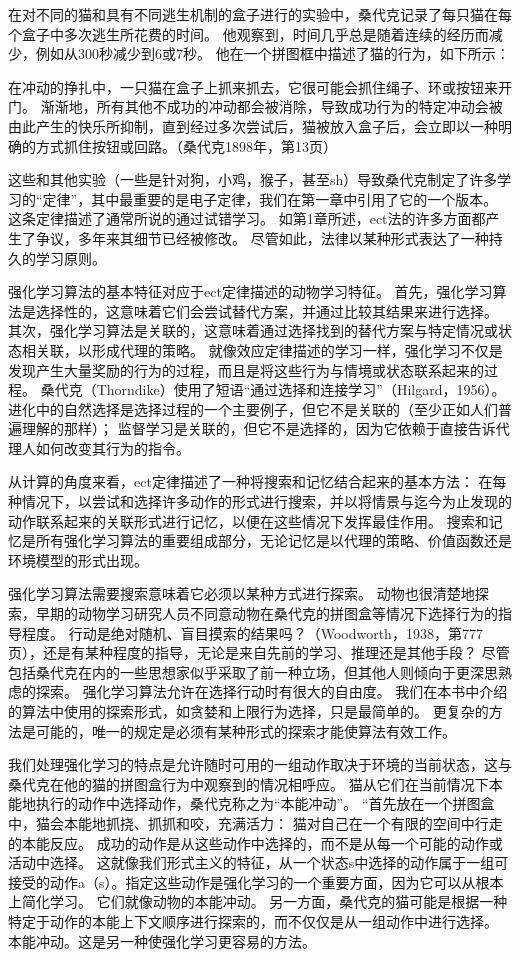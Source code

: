 {在对不同的猫和具有不同逃生机制的盒子进行的实验中，桑代克记录了每只猫在每个盒子中多次逃生所花费的时间。
他观察到，时间几乎总是随着连续的经历而减少，例如从300秒减少到6或7秒。
他在一个拼图框中描述了猫的行为，如下所示：


在冲动的挣扎中，一只猫在盒子上抓来抓去，它很可能会抓住绳子、环或按钮来开门。
渐渐地，所有其他不成功的冲动都会被消除，导致成功行为的特定冲动会被由此产生的快乐所抑制，直到经过多次尝试后，猫被放入盒子后，会立即以一种明确的方式抓住按钮或回路。（桑代克1898年，第13页）


这些和其他实验（一些是针对狗，小鸡，猴子，甚至sh）导致桑代克制定了许多学习的“定律”，其中最重要的是电子定律，我们在第一章中引用了它的一个版本。
这条定律描述了通常所说的通过试错学习。
如第1章所述，ect法的许多方面都产生了争议，多年来其细节已经被修改。
尽管如此，法律以某种形式表达了一种持久的学习原则。


强化学习算法的基本特征对应于ect定律描述的动物学习特征。
首先，强化学习算法是选择性的，这意味着它们会尝试替代方案，并通过比较其结果来进行选择。
其次，强化学习算法是关联的，这意味着通过选择找到的替代方案与特定情况或状态相关联，以形成代理的策略。
就像效应定律描述的学习一样，强化学习不仅是发现产生大量奖励的行为的过程，而且是将这些行为与情境或状态联系起来的过程。
桑代克（Thorndike）使用了短语“通过选择和连接学习”（Hilgard，1956）。
进化中的自然选择是选择过程的一个主要例子，但它不是关联的（至少正如人们普遍理解的那样）；
监督学习是关联的，但它不是选择的，因为它依赖于直接告诉代理人如何改变其行为的指令。


从计算的角度来看，ect定律描述了一种将搜索和记忆结合起来的基本方法：
在每种情况下，以尝试和选择许多动作的形式进行搜索，并以将情景与迄今为止发现的动作联系起来的关联形式进行记忆，以便在这些情况下发挥最佳作用。
搜索和记忆是所有强化学习算法的重要组成部分，无论记忆是以代理的策略、价值函数还是环境模型的形式出现。


强化学习算法需要搜索意味着它必须以某种方式进行探索。
动物也很清楚地探索，早期的动物学习研究人员不同意动物在桑代克的拼图盒等情况下选择行为的指导程度。
行动是绝对随机、盲目摸索的结果吗？（Woodworth，1938，第777页），还是有某种程度的指导，无论是来自先前的学习、推理还是其他手段？
尽管包括桑代克在内的一些思想家似乎采取了前一种立场，但其他人则倾向于更深思熟虑的探索。
强化学习算法允许在选择行动时有很大的自由度。
我们在本书中介绍的算法中使用的探索形式，如贪婪和上限行为选择，只是最简单的。
更复杂的方法是可能的，唯一的规定是必须有某种形式的探索才能使算法有效工作。


我们处理强化学习的特点是允许随时可用的一组动作取决于环境的当前状态，这与桑代克在他的猫的拼图盒行为中观察到的情况相呼应。
猫从它们在当前情况下本能地执行的动作中选择动作，桑代克称之为“本能冲动”。
“首先放在一个拼图盒中，猫会本能地抓挠、抓抓和咬，充满活力：
猫对自己在一个有限的空间中行走的本能反应。
成功的动作是从这些动作中选择的，而不是从每一个可能的动作或活动中选择。
这就像我们形式主义的特征，从一个状态s中选择的动作属于一组可接受的动作a（s）。指定这些动作是强化学习的一个重要方面，因为它可以从根本上简化学习。
它们就像动物的本能冲动。
另一方面，桑代克的猫可能是根据一种特定于动作的本能上下文顺序进行探索的，而不仅仅是从一组动作中进行选择。
本能冲动。这是另一种使强化学习更容易的方法。


}
